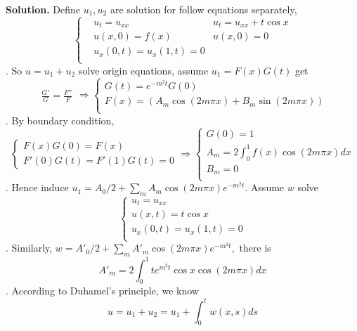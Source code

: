 \documentclass[a4paper]{book}
\newenvironment{solution}%
{\noindent\textbf{Solution.}}%
{\qedhere}
\numberwithin{equation}{chapter}
\theoremstyle{definition}
\begin{document}
\begin{solution}
    Define $u_1, u_2$ are solution for follow equations separately,
    \begin{equation*}
        \left\{ \begin{aligned}
             & u_t = u_{xx} \qquad \qquad \qquad & u_t = u_{xx} + t \cos x \\
             & u(x, 0) = f(x)                    & u(x, 0) = 0             \\
             & u_x(0, t) = u_x(1, t) = 0                                   \\
        \end{aligned}
        \right.
    \end{equation*}.
    So $u = u_1 +u_2$ solve origin equations, assume $u_1 = F(x)G(t)$ get
    \begin{equation*}
        \begin{array}{l}
            \frac{G'}{G} = \frac{F''}{F}
        \end{array}
        \Rightarrow
        \left\{ \begin{array}{l}
            G(t) = e^{-m^2t} G(0)                                             \\
            F(x) = (A_m \cos(2m \pi x) + B_m \sin(2m \pi x)) \\
        \end{array}
        \right.
    \end{equation*}.
    By boundary condition,
    \begin{equation*}
        \left\{
        \begin{array}{l}
            F(x)G(0) = F(x) \\
            F'(0)G(t) = F'(1)G(t) = 0
        \end{array}
        \right.
        \Rightarrow
        \left\{
        \begin{array}{l}
            G(0) = 1                               \\
            A_m = 2\int_0^1 f(x) \cos(2 m \pi x) dx \\
            B_m = 0                                \\
        \end{array}
        \right.
    \end{equation*}.
    Hence induce $u_1 = A_0/2 + \sum_m A_m \cos(2m\pi x)e^{-m^2 t}$. Assume
    $w$ solve
    \begin{equation*}
        \left\{
        \begin{array}{l}
            u_t = u_{xx}              \\
            u(x, t) = t \cos x        \\
            u_x(0, t) = u_x(1, t) = 0 \\
        \end{array}
        \right.
    \end{equation*}.
    Similarly, $w = A'_0/2 + \sum_m  A'_m \cos(2m\pi x)e^{-m^2 t}, $ there is
    \[ A'_m = 2\int_0^1 t e^{m^2 t} \cos x \cos(2 m \pi x) dx\].
    According to Duhamel's principle, we know 
    \[ u = u_1 + u_2 = u_1 + \int_0^t w(x, s) ds  \]
\end{solution}
\end{document}
